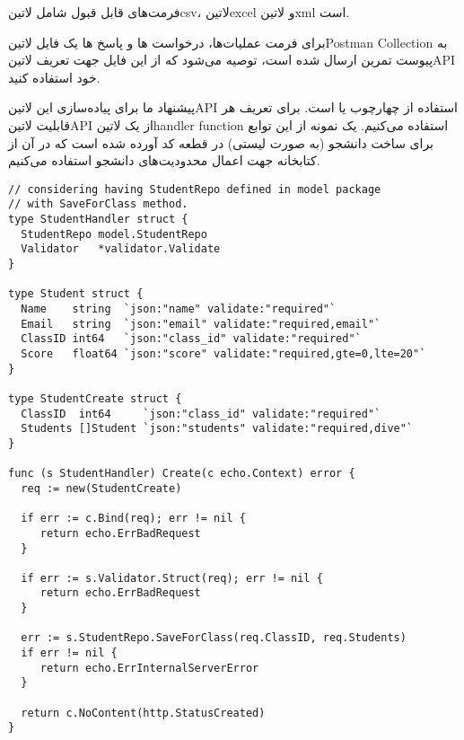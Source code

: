 \documentclass{../assignment}
\begin{document}
 فرمت‌های قابل قبول شامل ‌لاتین{csv}، ‌لاتین{excel} و ‌لاتین{xml} است.



برای فرمت عملیات‌ها، درخواست ها و پاسخ ها یک فایل ‌لاتین{Postman Collection} به پیوست تمرین ارسال شده است، توصیه می‌شود که از این فایل جهت تعریف ‌لاتین{API} خود استفاده کنید.

پیشنهاد ما برای پیاده‌سازی این ‌لاتین{API} استفاده از چهارچوب  یا  است.
برای تعریف هر قابلیت ‌لاتین{API} از یک ‌لاتین{handler function} استفاده می‌کنیم.
یک نمونه از این توابع برای ساخت دانشجو (به صورت لیستی) در قطعه کد  آورده شده است که در آن از کتابخانه  جهت اعمال محدودیت‌های دانشجو استفاده می‌کنیم.

\begin{listing}


\begin{latin}
\begin{verbatim}
// considering having StudentRepo defined in model package
// with SaveForClass method.
type StudentHandler struct {
  StudentRepo model.StudentRepo
  Validator   *validator.Validate
}

type Student struct {
  Name    string  `json:"name" validate:"required"`
  Email   string  `json:"email" validate:"required,email"`
  ClassID int64   `json:"class_id" validate:"required"`
  Score   float64 `json:"score" validate:"required,gte=0,lte=20"`
}

type StudentCreate struct {
  ClassID  int64     `json:"class_id" validate:"required"`
  Students []Student `json:"students" validate:"required,dive"`
}

func (s StudentHandler) Create(c echo.Context) error {
  req := new(StudentCreate)

  if err := c.Bind(req); err != nil {
     return echo.ErrBadRequest
  }

  if err := s.Validator.Struct(req); err != nil {
     return echo.ErrBadRequest
  }

  err := s.StudentRepo.SaveForClass(req.ClassID, req.Students)
  if err != nil {
     return echo.ErrInternalServerError
  }

  return c.NoContent(http.StatusCreated)
}
\end{verbatim}
\end{latin}

\end{listing}
\end{document}
